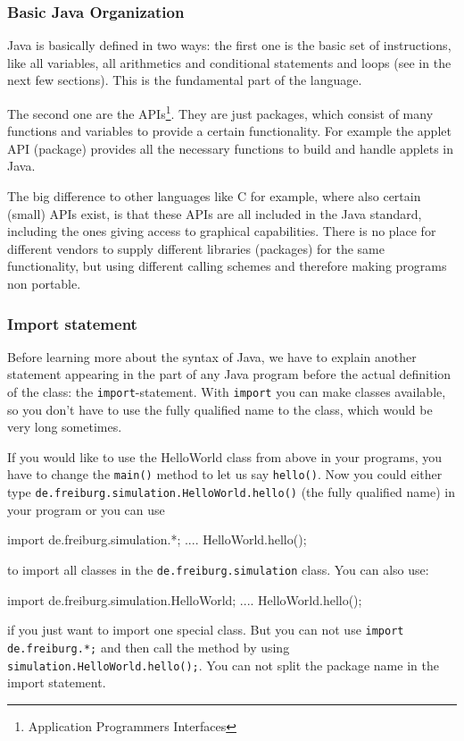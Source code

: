 \subsubsection{Basic Java Organization}
Java is basically defined in two ways: the first one is the basic
set of instructions, like all variables, all arithmetics and conditional
statements and loops (see in the next few sections). This is the
fundamental part of the language. 

The second one are the APIs\footnote{Application Programmers Interfaces}.
They are just packages, which consist of many functions and variables
to provide a certain functionality. For example the applet API (package)
provides all the necessary functions to build and handle applets
in Java. 

The big difference to other languages like C for example, where also
certain (small) APIs exist, is that these APIs are all included
in the Java standard, including the ones giving access to graphical
capabilities. There is no place for different vendors to supply
different libraries (packages) for the same functionality, but
using different calling schemes and therefore making programs
non portable. 

\subsubsection{Import statement}
Before learning more about the syntax of Java, we have to explain another
statement appearing in the part of any Java program before the actual
definition of the class: the \verb|import|-statement. With \verb|import|
you can make classes available, so you don't have to use the fully
qualified name to the class, which would be very long sometimes. 

If you would like to
use the HelloWorld class from above in your programs, you have to change
the \verb|main()| method to let us say \verb|hello()|. 
Now you could either
type \verb|de.freiburg.simulation.HelloWorld.hello()| (the fully qualified 
name) in your program or you can use
\begin{sverbatim}
import de.freiburg.simulation.*;
....
   HelloWorld.hello();
\end{sverbatim}
to import all classes in the \verb|de.freiburg.simulation| class.
You can also use:
\begin{sverbatim}
import de.freiburg.simulation.HelloWorld;
....
   HelloWorld.hello();
\end{sverbatim}
if you just want to import one special class. But you can not use 
\verb|import de.freiburg.*;| and then call the method by using
\verb|simulation.HelloWorld.hello();|. You can not split the
package name in the import statement.

